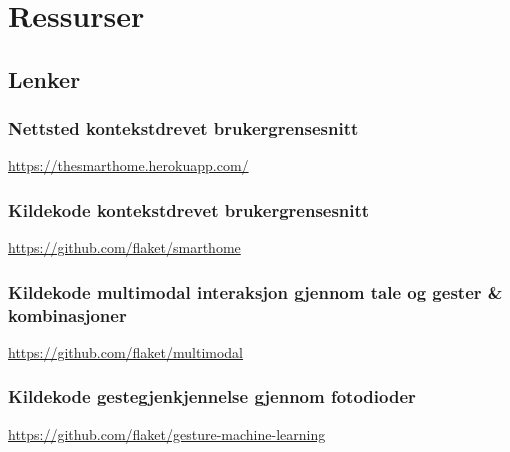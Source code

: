 \section{Ressurser}
\subsection*{Lenker}
\subsubsection*{Nettsted kontekstdrevet brukergrensesnitt}
\url{https://thesmarthome.herokuapp.com/}
\subsubsection*{Kildekode kontekstdrevet brukergrensesnitt}
\url{https://github.com/flaket/smarthome}
\subsubsection*{Kildekode multimodal interaksjon gjennom tale og gester \& kombinasjoner}
\url{https://github.com/flaket/multimodal}
\subsubsection*{Kildekode gestegjenkjennelse gjennom fotodioder}
\url{https://github.com/flaket/gesture-machine-learning}

